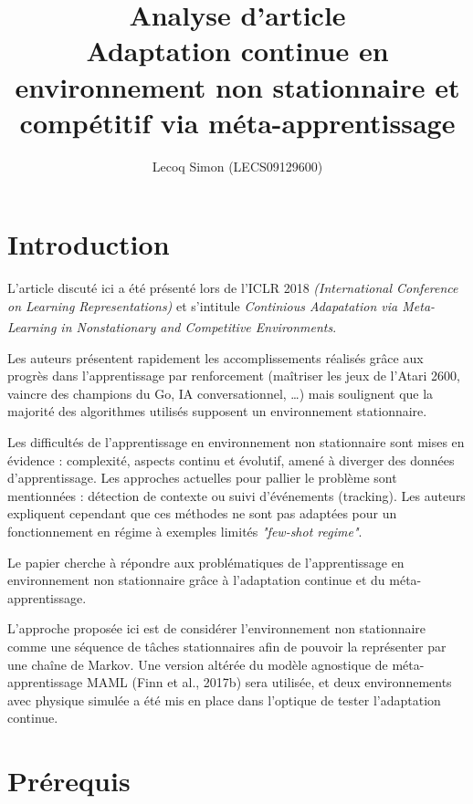 \documentclass[a4paper,11pt]{article}
\title{Analyse d'article\\\large Adaptation continue en environnement non stationnaire et compétitif via méta-apprentissage}
\author{Lecoq Simon (LECS09129600)}
\date{}
\begin{document}
    \maketitle
  
    \setlength{\parindent}{0ex}
    \setlength{\parskip}{1em}

    \section{Introduction}
    L’article discuté ici a été présenté lors de l’ICLR 2018 
    \textit{(International Conference on Learning Representations)} et s’intitule 
    \textit{Continious Adapatation via Meta-Learning in Nonstationary and Competitive 
    Environments}\textsuperscript{\cite{paper}}.

    Les auteurs présentent rapidement les accomplissements réalisés grâce aux progrès dans 
    l’apprentissage par renforcement (maîtriser les jeux de l’Atari 2600, vaincre des champions
    du Go, IA conversationnel, …) mais soulignent que la majorité des algorithmes utilisés 
    supposent un environnement stationnaire.

    Les difficultés de l’apprentissage en environnement non stationnaire sont mises 
    en évidence : complexité, aspects continu et évolutif, amené à diverger des données d'apprentissage. 
    Les approches actuelles pour pallier le problème sont mentionnées : détection de contexte ou 
    suivi d’événements (tracking). Les auteurs expliquent cependant 
    que ces méthodes ne sont pas adaptées pour un fonctionnement en régime à exemples limités 
    \textit{"few-shot regime"}. 
    
    Le papier cherche à répondre aux problématiques de l'apprentissage en environnement non 
    stationnaire grâce à l'adaptation continue et du méta-apprentissage.

    L'approche proposée ici est de considérer l'environnement non stationnaire comme une 
    séquence de tâches stationnaires afin de pouvoir la représenter par une chaîne de Markov. 
    Une version altérée du modèle agnostique de méta-apprentissage MAML (Finn et al., 2017b) sera 
    utilisée, et deux environnements avec physique simulée a été mis en place dans l'optique de 
    tester l'adaptation continue.


    \section{Prérequis}
\end{document}
